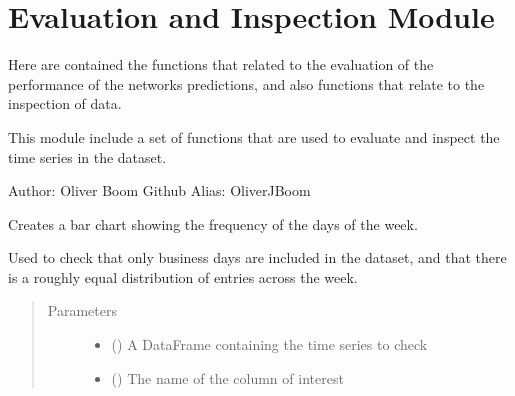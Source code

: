 \documentclass[letterpaper,10pt,english]{sphinxmanual}
\begin{document}
\begin{fulllineitems}
\begin{fulllineitems}
\begin{quote}
\begin{description}
\end{description}\end{quote}

\end{fulllineitems}


\end{fulllineitems}



\section{Evaluation and Inspection Module}
\label{\detokenize{eval_inspect:evaluation-and-inspection-module}}\label{\detokenize{eval_inspect::doc}}
Here are contained the functions that related to the evaluation of the performance of the networks predictions, and also functions that relate to the inspection of data.

\label{\detokenize{eval_inspect:module-Foresight.eval_inspect}}
This module include a set of functions that are used to evaluate and
inspect the time series in the dataset.

Author: Oliver Boom
Github Alias: OliverJBoom

\begin{fulllineitems}
\label{\detokenize{eval_inspect:Foresight.eval_inspect.check_day_frequency}}
Creates a bar chart showing the frequency of the days of the week.

Used to check that only business days are included in the dataset, and
that there is a roughly equal distribution of entries across the week.
\begin{quote}\begin{description}
\item[{Parameters}] \leavevmode\begin{itemize}
\item {} 
 () \textendash{} A DataFrame containing the time series to check

\item {} 
 () \textendash{} The name of the column of interest

\end{itemize}

\end{description}\end{quote}

\end{fulllineitems}
\end{document}
